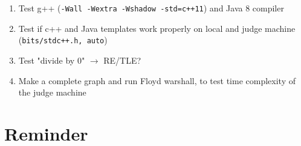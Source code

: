 \documentclass[10pt,oneside]{article}
\begin{document}
\begin{landscape}
\begin{multicols}{2}
{\normalsize
\begin{enumerate}
\item Test g++ (\texttt{-Wall -Wextra -Wshadow -std=c++11}) and Java 8 compiler
\item Test if c++ and Java templates work properly on local and judge machine (\texttt{bits/stdc++.h, auto})
\item Test "divide by 0" $\rightarrow$ RE/TLE?
\item Make a complete graph and run Floyd warshall, to test time complexity of the judge machine
\end{enumerate}
}


\section{Reminder}



\end{multicols}
\end{landscape}
\end{document}
